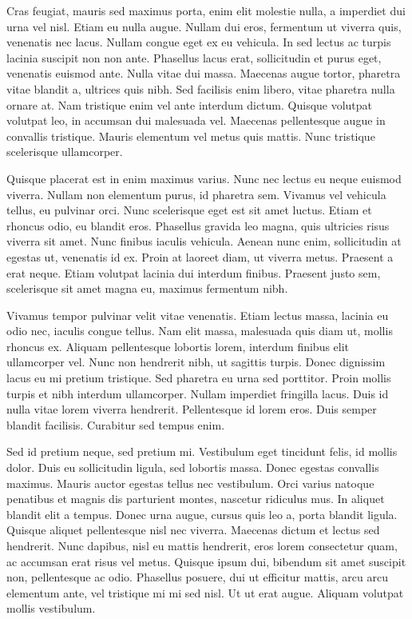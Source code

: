 \documentclass[conference]{IEEEtran}
\begin{document}
Cras feugiat, mauris sed maximus porta, enim elit molestie nulla, a imperdiet dui urna vel nisl. Etiam eu nulla augue. Nullam dui eros, fermentum ut viverra quis, venenatis nec lacus. Nullam congue eget ex eu vehicula. In sed lectus ac turpis lacinia suscipit non non ante. Phasellus lacus erat, sollicitudin et purus eget, venenatis euismod ante. Nulla vitae dui massa. Maecenas augue tortor, pharetra vitae blandit a, ultrices quis nibh. Sed facilisis enim libero, vitae pharetra nulla ornare at. Nam tristique enim vel ante interdum dictum. Quisque volutpat volutpat leo, in accumsan dui malesuada vel. Maecenas pellentesque augue in convallis tristique. Mauris elementum vel metus quis mattis. Nunc tristique scelerisque ullamcorper.

Quisque placerat est in enim maximus varius. Nunc nec lectus eu neque euismod viverra. Nullam non elementum purus, id pharetra sem. Vivamus vel vehicula tellus, eu pulvinar orci. Nunc scelerisque eget est sit amet luctus. Etiam et rhoncus odio, eu blandit eros. Phasellus gravida leo magna, quis ultricies risus viverra sit amet. Nunc finibus iaculis vehicula. Aenean nunc enim, sollicitudin at egestas ut, venenatis id ex. Proin at laoreet diam, ut viverra metus. Praesent a erat neque. Etiam volutpat lacinia dui interdum finibus. Praesent justo sem, scelerisque sit amet magna eu, maximus fermentum nibh.

Vivamus tempor pulvinar velit vitae venenatis. Etiam lectus massa, lacinia eu odio nec, iaculis congue tellus. Nam elit massa, malesuada quis diam ut, mollis rhoncus ex. Aliquam pellentesque lobortis lorem, interdum finibus elit ullamcorper vel. Nunc non hendrerit nibh, ut sagittis turpis. Donec dignissim lacus eu mi pretium tristique. Sed pharetra eu urna sed porttitor. Proin mollis turpis et nibh interdum ullamcorper. Nullam imperdiet fringilla lacus. Duis id nulla vitae lorem viverra hendrerit. Pellentesque id lorem eros. Duis semper blandit facilisis. Curabitur sed tempus enim.

Sed id pretium neque, sed pretium mi. Vestibulum eget tincidunt felis, id mollis dolor. Duis eu sollicitudin ligula, sed lobortis massa. Donec egestas convallis maximus. Mauris auctor egestas tellus nec vestibulum. Orci varius natoque penatibus et magnis dis parturient montes, nascetur ridiculus mus. In aliquet blandit elit a tempus. Donec urna augue, cursus quis leo a, porta blandit ligula. Quisque aliquet pellentesque nisl nec viverra. Maecenas dictum et lectus sed hendrerit. Nunc dapibus, nisl eu mattis hendrerit, eros lorem consectetur quam, ac accumsan erat risus vel metus. Quisque ipsum dui, bibendum sit amet suscipit non, pellentesque ac odio. Phasellus posuere, dui ut efficitur mattis, arcu arcu elementum ante, vel tristique mi mi sed nisl. Ut ut erat augue. Aliquam volutpat mollis vestibulum. 
\end{document}
